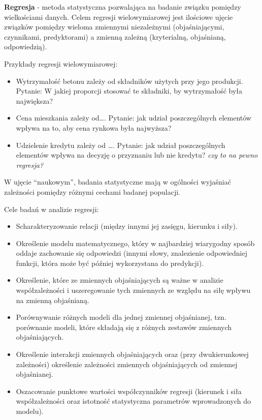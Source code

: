 \documentclass[
  polish,
  letterpaper,
  DIV=11,
  numbers=noendperiod]{scrreprt}
\providecommand{\tightlist}{%
  \setlength{\itemsep}{0pt}\setlength{\parskip}{0pt}}
\begin{document}
\textbf{Regresja} - metoda statystyczna pozwalająca na badanie związku
pomiędzy wielkościami danych. Celem regresji wielowymiarowej jest
ilościowe ujęcie związków pomiędzy wieloma zmiennymi niezależnymi
(objaśniającymi, czynnikami, predyktorami) a zmienną zależną
(kryterialną, objaśnianą, odpowiedzią).

Przykłady regresji wielowymiarowej:

\begin{itemize}
\item
  Wytrzymałość betonu zależy od składników użytych przy jego produkcji.
  Pytanie: W jakiej proporcji stosować te składniki, by wytrzymałość
  była największa?
\item
  Cena mieszkania zależy od\ldots. Pytanie: jak udział poszczególnych
  elementów wpływa na to, aby cena rynkowa była najwyższa?
\item
  Udzielenie kredytu zależy od \ldots. Pytanie: jak udział
  poszczególnych elementów wpływa na decyzję o przyznaniu lub nie
  kredytu? \emph{czy to na pewno regresja?}
\end{itemize}

W ujęcie ``naukowym'', badania statystyczne mają w ogólności wyjaśniać
zależności pomiędzy różnymi cechami badanej populacji.

Cele badań w analizie regresji:

\begin{itemize}
\tightlist
\item
  Scharakteryzowanie relacji (między innymi jej zasięgu, kierunku i
  siły).
\item
  Określenie modelu matematycznego, który w najbardziej wiarygodny
  sposób oddaje zachowanie się odpowiedzi (innymi słowy, znalezienie
  odpowiedniej funkcji, która może być później wykorzystana do
  predykcji).
\item
  Określenie, które ze zmiennych objaśniających są ważne w analizie
  współzależności i uszeregowanie tych zmiennych ze względu na siłę
  wpływu na zmienną objaśnianą.
\item
  Porównywanie różnych modeli dla jednej zmiennej objaśnianej, tzn.
  porównanie modeli, które składają się z różnych zestawów zmiennych
  objaśniających.
\item
  Określenie interakcji zmiennych objaśniających oraz (przy
  dwukierunkowej zależności) określenie zależności zmiennych
  objaśniających od zmiennej objaśnianej.
\item
  Oszacowanie punktowe wartości współczynników regresji (kierunek i siła
  współzależności oraz istotność statystyczna parametrów wprowadzonych
  do modelu).
\end{itemize}
\end{document}
